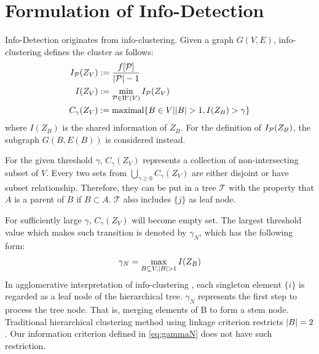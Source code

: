 \documentclass[runningheads]{llncs}
\begin{document}
\section{Formulation of Info-Detection}\label{sec:ID}
Info-Detection originates from info-clustering. Given a graph $G(V,E)$, info-clustering defines the cluster as follows:
\begin{align}
I_{\P}(Z_V) & := \frac{ f[\P] }{  \abs{\mathcal{P}} - 1 }\\
I(Z_V) & := \min_{\mathcal{P} \in \Pi'(V)} I_{\mathcal{P}}(Z_V)  \label{eq:ms} \\
C_{\gamma}(Z_V) & := \textrm{maximal}\{ B \in V \vert \abs{B} > 1, I(Z_B) > \gamma \} \label{eq:CgZv}
\end{align}
where $I(Z_B)$ is the shared information of $Z_B$. For the definition of $I_{\P}(Z_B)$, the subgraph $G(B,E(B))$ is considered instead.

For the given threshold $\gamma$, $C_{\gamma} (Z_V)$ represents a collection of non-intersecting subset of $V$. Every two sets from $\bigcup_{\gamma \geq 0} C_{\gamma}(Z_V)$ are either disjoint or have subset relationship. Therefore, they can be put in a tree $\mathcal{T}$ with the property that $A$ is a parent of $B$ if $B\subset A$. $\mathcal{T}$ also includes $\{j\}$ as leaf node. 

For sufficiently large $\gamma$, $C_{\gamma} (Z_V)$ will become empty set. The largest threshold value which makes such transition is denoted by $\gamma_N$, which has the following form:
\begin{equation}\label{eq:gammaN}
\gamma_N = \max_{B\subseteq V, \abs{B}>1} I(Z_B)
\end{equation}
In agglomerative interpretation of info-clustering \cite{RN8}, each singleton element $\{i\}$ is regarded as a leaf node of the hierarchical tree. $\gamma_N$ represents the first step to process the tree node. That is, merging elements of B to form a stem node. Traditional hierarchical clustering method using linkage criterion restricts $\abs{B}=2$. Our information criterion defined in \eqref{eq:gammaN} does not have such restriction. 
\end{document}
